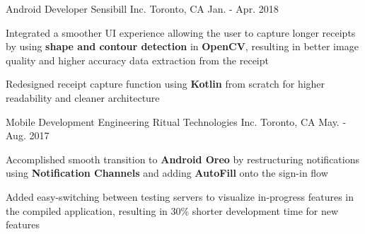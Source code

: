 \begin{cventries}
\cventry
{Android Developer} %
{Sensibill Inc.} %
{Toronto, CA} %
{Jan. - Apr. 2018} %
{ %
\begin{cvitems}
\item {
    Integrated a smoother UI experience allowing 
    the user to capture longer receipts by using 
    \textbf{shape and contour detection} in \textbf{OpenCV}, 
    resulting in better image quality 
    and higher accuracy data extraction from
    the receipt
}
\item {
    Redesigned receipt capture function 
    using \textbf{Kotlin} from scratch 
    for higher readability and cleaner architecture
}
\end{cvitems}
}

\cventry
{Mobile Development Engineering} %
{Ritual Technologies Inc.} %
{Toronto, CA} %
{May. - Aug. 2017} %
{ %
\begin{cvitems}
\item {
    Accomplished smooth transition to 
    \textbf{Android Oreo} 
    by restructuring notifications using 
    \textbf{Notification Channels}
    and adding 
    \textbf{AutoFill} onto the sign-in flow
}
\item {
    Added easy-switching between testing servers 
    to visualize in-progress features 
    in the compiled application, 
    resulting in 30\% shorter development time for new features
}
\end{cvitems} 
}


\end{cventries}